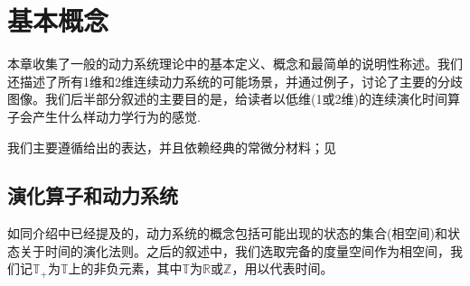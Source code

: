 \chapter{基本概念}

本章收集了一般的动力系统理论中的基本定义、概念和最简单的说明性称述。我们还描述了所有1维和2维连续动力系统的可能场景，并通过例子，讨论了主要的分歧图像。我们后半部分叙述的主要目的是，给读者以低维(1或2维)的连续演化时间算子会产生什么样动力学行为的感觉.

我们主要遵循给出的表达，并且依赖经典的常微分材料；见\cite{G03}

\section{演化算子和动力系统}

如同介绍中已经提及的，动力系统的概念包括可能出现的状态的集合(相空间)和状态关于时间的演化法则。之后的叙述中，我们选取完备的度量空间作为相空间，我们记$\mathbb{T}_{+}$为$\mathbb{T}$上的非负元素，其中$\mathbb{T}$为$\mathbb{R}$或$\mathbb{Z}$，用以代表时间。